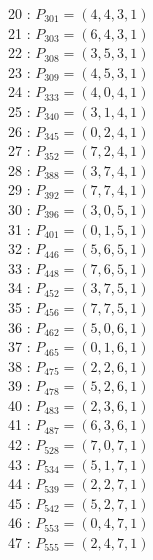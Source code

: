 \documentclass{article}
\begin{document}
{\begin{multicols}{2}
20 : $P_{301}=( 4, 4, 3, 1 )$\\
21 : $P_{303}=( 6, 4, 3, 1 )$\\
22 : $P_{308}=( 3, 5, 3, 1 )$\\
23 : $P_{309}=( 4, 5, 3, 1 )$\\
24 : $P_{333}=( 4, 0, 4, 1 )$\\
25 : $P_{340}=( 3, 1, 4, 1 )$\\
26 : $P_{345}=( 0, 2, 4, 1 )$\\
27 : $P_{352}=( 7, 2, 4, 1 )$\\
28 : $P_{388}=( 3, 7, 4, 1 )$\\
29 : $P_{392}=( 7, 7, 4, 1 )$\\
30 : $P_{396}=( 3, 0, 5, 1 )$\\
31 : $P_{401}=( 0, 1, 5, 1 )$\\
32 : $P_{446}=( 5, 6, 5, 1 )$\\
33 : $P_{448}=( 7, 6, 5, 1 )$\\
34 : $P_{452}=( 3, 7, 5, 1 )$\\
35 : $P_{456}=( 7, 7, 5, 1 )$\\
36 : $P_{462}=( 5, 0, 6, 1 )$\\
37 : $P_{465}=( 0, 1, 6, 1 )$\\
38 : $P_{475}=( 2, 2, 6, 1 )$\\
39 : $P_{478}=( 5, 2, 6, 1 )$\\
40 : $P_{483}=( 2, 3, 6, 1 )$\\
41 : $P_{487}=( 6, 3, 6, 1 )$\\
42 : $P_{528}=( 7, 0, 7, 1 )$\\
43 : $P_{534}=( 5, 1, 7, 1 )$\\
44 : $P_{539}=( 2, 2, 7, 1 )$\\
45 : $P_{542}=( 5, 2, 7, 1 )$\\
46 : $P_{553}=( 0, 4, 7, 1 )$\\
47 : $P_{555}=( 2, 4, 7, 1 )$\\
\end{multicols}
}
\end{document}
